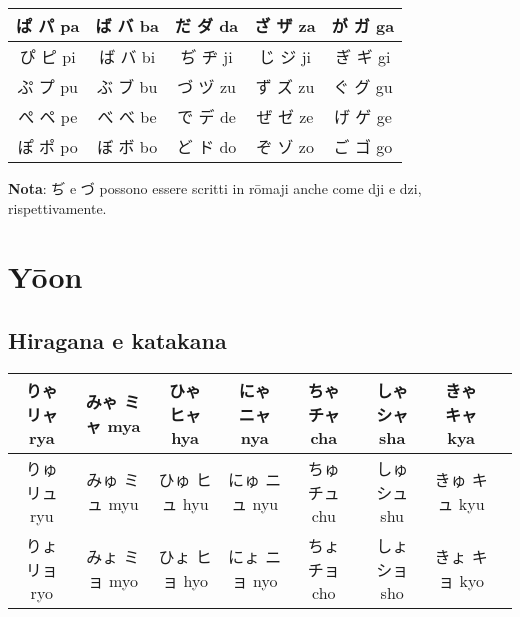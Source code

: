 \documentclass{article}
\begin{document}
        \begin{center}
            \begin{japanese}
                \begin{tabular}{|c|c|c|c|c|}
                    \hline
                    ぱ パ pa & ば バ ba & だ ダ da & ざ ザ za & が ガ ga\\
                    \hline
                    ぴ ピ pi & ば バ bi & ぢ ヂ ji & じ ジ ji & ぎ ギ gi\\
                    \hline
                    ぷ プ pu & ぶ ブ bu & づ ヅ zu & ず ズ zu & ぐ グ gu\\
                    \hline
                    ぺ ペ pe & べ べ be & で デ de & ぜ ゼ ze & げ ゲ ge\\
                    \hline
                    ぽ ポ po & ぼ ボ bo & ど ド do & ぞ ゾ zo & ご ゴ go\\
                    \hline
                \end{tabular}
            \end{japanese}
        \end{center}

        \textbf{Nota}: \textjapanese{ぢ} e \textjapanese{づ} possono essere scritti in rōmaji anche come \textjapanese{dji} e \textjapanese{dzi}, rispettivamente.

    \section{Y\={o}on}

        \subsection{Hiragana e katakana}

            \begin{center}
                \begin{japanese}
                    \begin{tabular}{|c|c|c|c|c|c|c|c|}
                        \hline
                        りゃ リャ rya & みゃ ミャ mya & ひゃ ヒャ hya & にゃ ニャ nya & ちゃ チャ cha & しゃ シャ sha & きゃ キャ kya\\
                        \hline
                        りゅ リュ ryu & みゅ ミュ myu & ひゅ ヒュ hyu & にゅ ニュ nyu & ちゅ チュ chu & しゅ シュ shu & きゅ キュ kyu\\
                        \hline
                        りょ リョ ryo & みょ ミョ myo & ひょ ヒョ hyo & にょ ニョ nyo & ちょ チョ cho & しょ ショ sho & きょ キョ kyo\\
                        \hline
                    \end{tabular}
                \end{japanese}
            \end{center}
\end{document}
